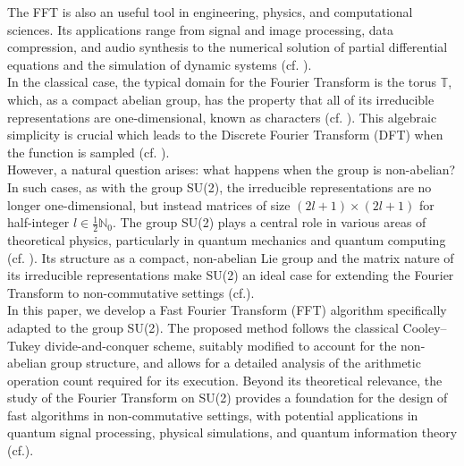 \documentclass[11pt]{article}
\theoremstyle{definition}
\theoremstyle{remark}
\numberwithin{equation}{section}
\begin{document}
The FFT is also an useful tool in engineering, physics, and computational sciences. Its applications range from signal and image processing, data compression, and audio synthesis to the numerical solution of partial differential equations and the simulation of dynamic systems (cf. \cite{FFT_Aplications,FFTphoto}).\\%


In the classical case, the typical domain for the Fourier Transform is the torus
$\mathbb{T}$, which, as a compact abelian group, has the property that all of its irreducible representations are one-dimensional, known as characters (cf. \cite{Toro1,Toro2,stein2011fourier}). This algebraic simplicity is crucial
which leads to the Discrete Fourier Transform (DFT) when the function is sampled
(cf. \cite{ruzhansky2009pseudo, Toro1}).\\%

However, a natural question arises: what happens when the group is non-abelian? In such cases, as with the group
SU(2), the irreducible representations are no longer one-dimensional, but instead matrices of size $(2l+1) \times (2l+1)$ for half-integer $l \in \tfrac{1}{2}\mathbb{N}_0$. 
The group SU(2) plays a central role in various areas of theoretical physics, particularly in quantum mechanics and quantum computing (cf. \cite{bastidas2024complexification, Bastidasquantum}). Its structure as a compact, non-abelian Lie group and the matrix nature of its irreducible representations make SU(2) an ideal case for extending the Fourier Transform to non-commutative settings (cf.\cite{Faraut_2008}).\\%

In this paper, we develop a Fast Fourier Transform (FFT) algorithm specifically adapted to the group SU(2). 
The proposed method follows the classical Cooley--Tukey divide-and-conquer scheme, suitably modified to account for the non-abelian group structure, and allows for a detailed analysis of the arithmetic operation count required for its execution. Beyond its theoretical relevance, the study of the Fourier Transform on SU(2) provides a foundation for the design of fast algorithms in non-commutative settings, with potential applications in quantum signal processing, physical simulations, and quantum information theory (cf.\cite{Cite_Aplications_inverse, Quantum_SU(2)}).\\
\end{document}
